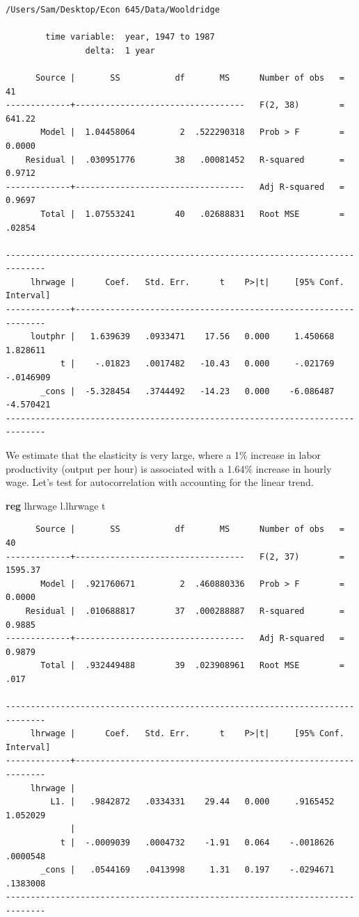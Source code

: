 \documentclass[
]{book}
\newenvironment{Shaded}{\begin{snugshade}}{\end{snugshade}}
\newcommand{\KeywordTok}[1]{\textcolor[rgb]{0.13,0.29,0.53}{\textbf{#1}}}
\newcommand{\NormalTok}[1]{#1}
\newcommand{\OtherTok}[1]{\textcolor[rgb]{0.56,0.35,0.01}{#1}}
\begin{document}
\begin{verbatim}
/Users/Sam/Desktop/Econ 645/Data/Wooldridge

        time variable:  year, 1947 to 1987
                delta:  1 year

      Source |       SS           df       MS      Number of obs   =        41
-------------+----------------------------------   F(2, 38)        =    641.22
       Model |  1.04458064         2  .522290318   Prob > F        =    0.0000
    Residual |  .030951776        38   .00081452   R-squared       =    0.9712
-------------+----------------------------------   Adj R-squared   =    0.9697
       Total |  1.07553241        40   .02688831   Root MSE        =    .02854

------------------------------------------------------------------------------
     lhrwage |      Coef.   Std. Err.      t    P>|t|     [95% Conf. Interval]
-------------+----------------------------------------------------------------
     loutphr |   1.639639   .0933471    17.56   0.000     1.450668    1.828611
           t |    -.01823   .0017482   -10.43   0.000     -.021769   -.0146909
       _cons |  -5.328454   .3744492   -14.23   0.000    -6.086487   -4.570421
------------------------------------------------------------------------------
\end{verbatim}

We estimate that the elasticity is very large, where a 1\% increase in labor
productivity (output per hour) is associated with a 1.64\% increase in hourly
wage. Let's test for autocorrelation with accounting for the linear trend.

\begin{Shaded}
\begin{Highlighting}[]
\KeywordTok{reg}\NormalTok{ lhrwage }\OtherTok{l}\NormalTok{.lhrwage t}
\end{Highlighting}
\end{Shaded}

\begin{verbatim}
      Source |       SS           df       MS      Number of obs   =        40
-------------+----------------------------------   F(2, 37)        =   1595.37
       Model |  .921760671         2  .460880336   Prob > F        =    0.0000
    Residual |  .010688817        37  .000288887   R-squared       =    0.9885
-------------+----------------------------------   Adj R-squared   =    0.9879
       Total |  .932449488        39  .023908961   Root MSE        =      .017

------------------------------------------------------------------------------
     lhrwage |      Coef.   Std. Err.      t    P>|t|     [95% Conf. Interval]
-------------+----------------------------------------------------------------
     lhrwage |
         L1. |   .9842872   .0334331    29.44   0.000     .9165452    1.052029
             |
           t |  -.0009039   .0004732    -1.91   0.064    -.0018626    .0000548
       _cons |   .0544169   .0413998     1.31   0.197    -.0294671    .1383008
------------------------------------------------------------------------------
\end{verbatim}
\end{document}
